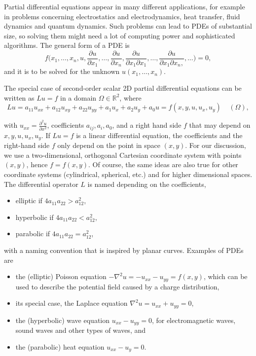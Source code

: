 Partial differential equations appear in many different applications, for example in problems concerning electrostatics and electrodynamics, heat transfer, fluid dynamics and quantum dynamics. Such problems can lead to PDEs of substantial size, so solving them might need a lot of computing power and sophisticated algorithms. The general form of a PDE is
\begin{equation}
f\big(x_1, \hdots, x_n, u, \frac{\partial u}{\partial x_1}, \hdots, \frac{\partial u}{\partial x_n}, \frac{\partial u}{\partial x_1 \partial x_1} , \hdots, \frac{\partial u}{\partial x_1 \partial x_n, },  \hdots \big) = 0, 
\end{equation}
and it is to be solved for the unknown $u(x_1, \hdots, x_n)$.

The special case of second-order scalar 2D partial differential equations can be written as $Lu = f$ in a domain $\Omega \in \mathbb{R}^2$, where 
\begin{equation}
Lu = a_{11}u_{xx} + a_{12}u_{xy} + a_{22}u_{yy} + a_{1}u_{x} + a_{2}u_{y} + a_{0}u = f(x, y, u, u_x, u_y)~~~~~(\Omega),
\label{equ:2D_part_differ}
\end{equation}

with $u_{xx} = \frac{\partial ^2u}{\partial x^2}$, coefficients $a_{ij}, a_i, a_0$, and a right hand side $f$ that may depend on $x, y, u, u_x, u_y$. If $Lu = f$ is a linear differential equation, the coefficients and the right-hand side $f$ only depend on the point in space $(x,y)$. For our discussion, we use a two-dimensional, orthogonal Cartesian coordinate system with points $(x,y)$, hence $f = f(x,y)$. Of course, the same ideas are also true for other coordinate systems (cylindrical, spherical, etc.) and for higher dimensional spaces.  The differential operator $L$ is named depending on the coefficients, 
\begin{itemize}
\item elliptic if $4a_{11}a_{22} > a_{12}^2$,
\item hyperbolic if $4a_{11}a_{22} < a_{12}^2$,
\item parabolic if $4a_{11}a_{22} = a_{12}^2$,
\end{itemize}
with a naming convention that is inspired by planar curves. Examples of PDEs are 
\begin{itemize}
\item the (elliptic) Poisson equation $-\nabla^2 u = -u_{xx} - u_{yy} = f(x,y)$, which can be used to describe the potential field caused by a charge distribution,
\item its special case, the Laplace equation $\nabla^2 u = u_{xx}  + u_{yy} = 0$,
\item the (hyperbolic) wave equation $u_{xx} - u_{yy} = 0$, for electromagnetic waves, sound waves and other types of waves, and
\item the (parabolic) heat equation $u_{xx} - u_y = 0$.
\end{itemize}


